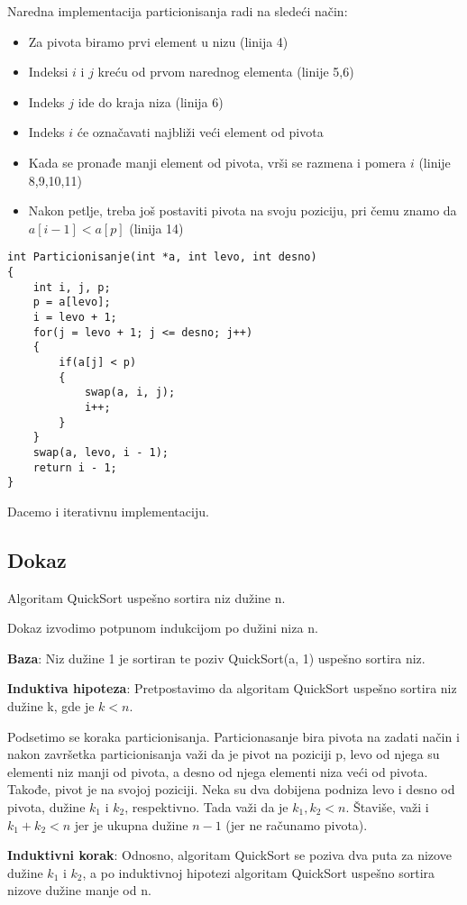\documentclass{memoir}
\begin{document}
Naredna implementacija particionisanja radi na sledeći način:
\begin{itemize}
 \item Za pivota biramo prvi element u nizu (linija 4)
 \item Indeksi $i$ i $j$ kreću od prvom narednog elementa (linije 5,6)
 \item Indeks $j$ ide do kraja niza (linija 6)
 \item Indeks $i$ će označavati najbliži veći element od pivota
 \item Kada se pronađe manji element od pivota, vrši se razmena i pomera $i$ (linije 8,9,10,11)
 \item Nakon petlje, treba još postaviti pivota na svoju poziciju, pri čemu znamo da $ a[i-1] < a[p] $ (linija 14)
\end{itemize}

\begin{lstlisting}
int Particionisanje(int *a, int levo, int desno)
{
	int i, j, p;
	p = a[levo];
	i = levo + 1;
	for(j = levo + 1; j <= desno; j++)
	{
		if(a[j] < p)
		{
			swap(a, i, j);
			i++;
		}
	}
	swap(a, levo, i - 1);
	return i - 1;
}
\end{lstlisting}

Dacemo i iterativnu implementaciju.

\subsection{Dokaz}
\begin{tvrdjenje}
 Algoritam QuickSort uspešno sortira niz dužine n.
\end{tvrdjenje}

\begin{dokaz}
Dokaz izvodimo potpunom indukcijom po dužini niza n.

\textbf{Baza}: Niz dužine 1 je sortiran te poziv QuickSort(a, 1) uspešno sortira niz.

\textbf{Induktiva hipoteza}:
Pretpostavimo da algoritam QuickSort uspešno sortira niz dužine k, gde je $ k < n $.

Podsetimo se koraka particionisanja. Particionasanje bira pivota na zadati način i nakon završetka particionisanja važi da je pivot na poziciji p,
levo od njega su elementi niz manji od pivota, a desno od njega elementi niza veći od pivota. Takođe, pivot je na svojoj poziciji.
Neka su dva dobijena podniza levo i desno od pivota, dužine $ k_1 $ i $ k_2 $, respektivno. Tada važi da je $ k_1, k_2 < n $. Štaviše, važi i $ k_1 + k_2 < n 
$ jer je ukupna dužine $ n-1 $ (jer ne računamo pivota).

\textbf{Induktivni korak}:
Odnosno, algoritam QuickSort se poziva dva puta za nizove dužine $ k_1 $ i $ k_2 $, a po induktivnoj hipotezi algoritam QuickSort uspešno sortira nizove dužine 
manje od n. 
\end{dokaz}
\end{document}
